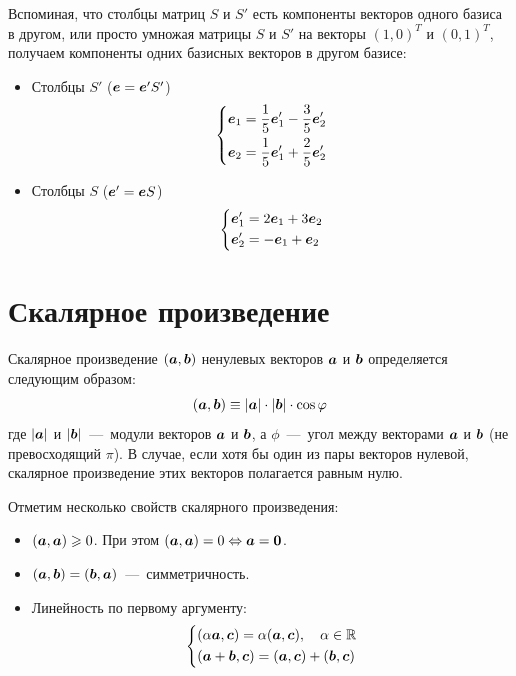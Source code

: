 \documentclass[a4paper,12pt]{article}
\begin{document}
\begin{solution}
    Вспоминая, что столбцы матриц $S$ и $S'$ есть компоненты векторов одного базиса в другом, или просто умножая матрицы $S$ и $S'$ на векторы $(1, 0)^T$ и $(0, 1)^T$, получаем компоненты одних базисных векторов в другом базисе:
    \begin{itemize}
      \item Столбцы $S'$ ($\bds e \hm= \bds e' S'$)
        \[
          \left\{
            \begin{aligned}
              &\boldsymbol e_1 = \frac{1}{5} \boldsymbol e_1' - \frac{3}{5} \boldsymbol e_2'\\
              &\boldsymbol e_2 = \frac{1}{5} \boldsymbol e_1' + \frac{2}{5} \boldsymbol e_2'
            \end{aligned}
          \right.
        \]
      \item Столбцы $S$ ($\bds e' \hm= \bds e S$)
        \[
          \left\{
            \begin{aligned}
              &\boldsymbol e_1' = 2 \boldsymbol e_1 + 3 \boldsymbol e_2\\
              &\boldsymbol e_2' = -\boldsymbol e_1 + \boldsymbol e_2
            \end{aligned}
          \right.
        \]
    \end{itemize}
  \end{solution}



  \section{Скалярное произведение}
  
  \begin{definition}
    Скалярное произведение $(\boldsymbol a, \boldsymbol b)$ ненулевых векторов $\boldsymbol a$ и $\boldsymbol b$ определяется следующим образом:
    \begin{equation}
      (\boldsymbol a, \boldsymbol b) \equiv |\boldsymbol a| \cdot |\boldsymbol b| \cdot \cos \varphi
    \end{equation}
    где $|\boldsymbol a|$ и $|\boldsymbol b|$~---~модули векторов $\boldsymbol a$ и $\boldsymbol b$,
    а $\phi$~---~угол между векторами $\boldsymbol a$ и $\boldsymbol b$ (не превосходящий $\pi$).
    В случае, если хотя бы один из пары векторов нулевой, скалярное произведение этих векторов полагается равным нулю.
  \end{definition}
  
  Отметим несколько свойств скалярного произведения:
  \begin{itemize}
    \item $(\boldsymbol a, \boldsymbol a) \geqslant 0$. При этом $(\bds a, \bds a) \hm= 0 \hm\Leftrightarrow \bds a \hm= \bds 0$.
    \item $(\boldsymbol a, \boldsymbol b) = (\boldsymbol b, \boldsymbol a)$~---~симметричность.
    \item Линейность по первому аргументу:
      \[
        \left\{
          \begin{aligned}
            &(\alpha \boldsymbol a, \boldsymbol c) = \alpha (\boldsymbol a, \boldsymbol c),\quad \alpha \in \operatorname{\mathbb R}\\
            &(\boldsymbol a + \boldsymbol b, \boldsymbol c) = (\boldsymbol a, \boldsymbol c) + (\boldsymbol b, \boldsymbol c)
          \end{aligned}
        \right.
      \]
  \end{itemize}
  
\end{document}
